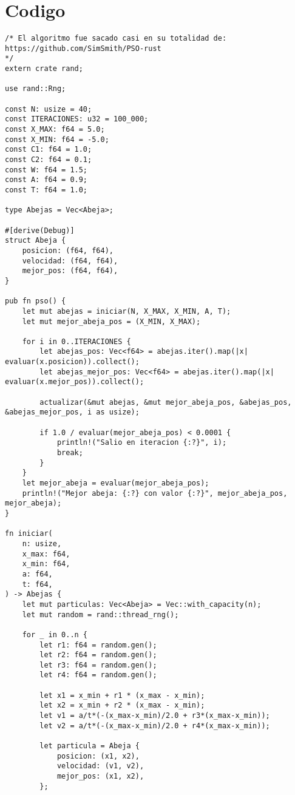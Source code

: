 \documentclass{article}
\begin{document}
\section*{Codigo}
\begin{verbatim}
/* El algoritmo fue sacado casi en su totalidad de:
https://github.com/SimSmith/PSO-rust
*/
extern crate rand;

use rand::Rng;

const N: usize = 40;
const ITERACIONES: u32 = 100_000;
const X_MAX: f64 = 5.0;
const X_MIN: f64 = -5.0;
const C1: f64 = 1.0;
const C2: f64 = 0.1;
const W: f64 = 1.5;
const A: f64 = 0.9;
const T: f64 = 1.0;

type Abejas = Vec<Abeja>;

#[derive(Debug)]
struct Abeja {
    posicion: (f64, f64),
    velocidad: (f64, f64),
    mejor_pos: (f64, f64),
}

pub fn pso() {
    let mut abejas = iniciar(N, X_MAX, X_MIN, A, T);
    let mut mejor_abeja_pos = (X_MIN, X_MAX);

    for i in 0..ITERACIONES {
        let abejas_pos: Vec<f64> = abejas.iter().map(|x| evaluar(x.posicion)).collect();
        let abejas_mejor_pos: Vec<f64> = abejas.iter().map(|x| evaluar(x.mejor_pos)).collect();

        actualizar(&mut abejas, &mut mejor_abeja_pos, &abejas_pos, &abejas_mejor_pos, i as usize);

        if 1.0 / evaluar(mejor_abeja_pos) < 0.0001 {
            println!("Salio en iteracion {:?}", i);
            break;
        }
    }    
    let mejor_abeja = evaluar(mejor_abeja_pos);
    println!("Mejor abeja: {:?} con valor {:?}", mejor_abeja_pos, mejor_abeja);
}

fn iniciar(
    n: usize,
    x_max: f64,
    x_min: f64,
    a: f64,
    t: f64,
) -> Abejas {
    let mut particulas: Vec<Abeja> = Vec::with_capacity(n);
    let mut random = rand::thread_rng();

    for _ in 0..n {
        let r1: f64 = random.gen();
        let r2: f64 = random.gen();
        let r3: f64 = random.gen();
        let r4: f64 = random.gen();

        let x1 = x_min + r1 * (x_max - x_min);
        let x2 = x_min + r2 * (x_max - x_min);
        let v1 = a/t*(-(x_max-x_min)/2.0 + r3*(x_max-x_min));
        let v2 = a/t*(-(x_max-x_min)/2.0 + r4*(x_max-x_min));

        let particula = Abeja {
            posicion: (x1, x2),
            velocidad: (v1, v2),
            mejor_pos: (x1, x2),
        };


\end{verbatim}
\end{document}

